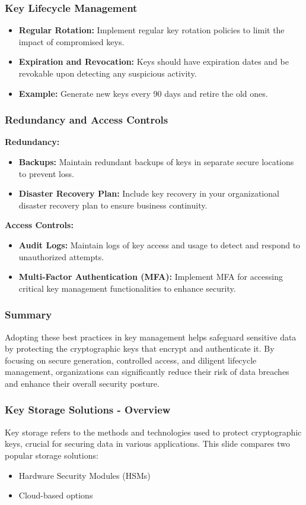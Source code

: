 \documentclass{beamer}
\begin{document}
\begin{frame}[fragile]
    \frametitle{Key Lifecycle Management}
    \begin{itemize}
        \item \textbf{Regular Rotation:} Implement regular key rotation policies to limit the impact of compromised keys.
        \item \textbf{Expiration and Revocation:} Keys should have expiration dates and be revokable upon detecting any suspicious activity.
        \item \textbf{Example:} Generate new keys every 90 days and retire the old ones.
    \end{itemize}
\end{frame}

\begin{frame}[fragile]
    \frametitle{Redundancy and Access Controls}
    \textbf{Redundancy:}
    \begin{itemize}
        \item \textbf{Backups:} Maintain redundant backups of keys in separate secure locations to prevent loss.
        \item \textbf{Disaster Recovery Plan:} Include key recovery in your organizational disaster recovery plan to ensure business continuity.
    \end{itemize}

    \textbf{Access Controls:}
    \begin{itemize}
        \item \textbf{Audit Logs:} Maintain logs of key access and usage to detect and respond to unauthorized attempts.
        \item \textbf{Multi-Factor Authentication (MFA):} Implement MFA for accessing critical key management functionalities to enhance security.
    \end{itemize}
\end{frame}

\begin{frame}[fragile]
    \frametitle{Summary}
    Adopting these best practices in key management helps safeguard sensitive data by protecting the cryptographic keys that encrypt and authenticate it. By focusing on secure generation, controlled access, and diligent lifecycle management, organizations can significantly reduce their risk of data breaches and enhance their overall security posture.
\end{frame}

\begin{frame}[fragile]
    \frametitle{Key Storage Solutions - Overview}
    Key storage refers to the methods and technologies used to protect cryptographic keys, crucial for securing data in various applications. This slide compares two popular storage solutions: 
    \begin{itemize}
        \item Hardware Security Modules (HSMs)
        \item Cloud-based options
    \end{itemize}
\end{frame}
\end{document}

